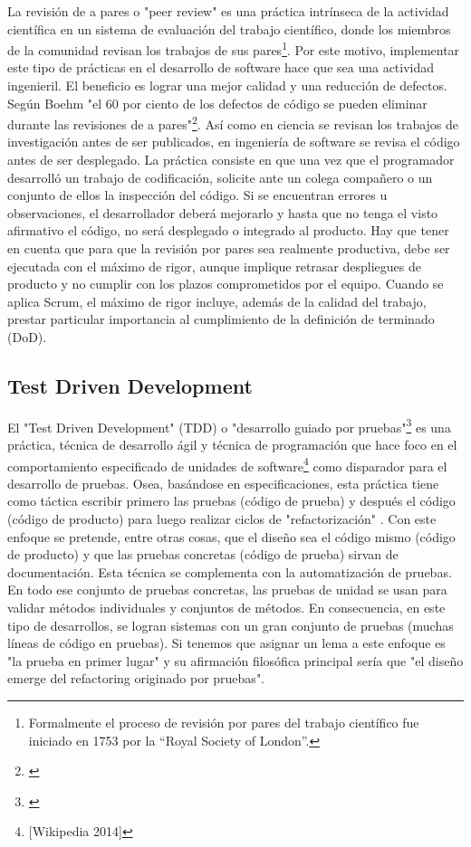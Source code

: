 La revisión de a pares o "peer review" es una práctica intrínseca de la actividad científica en un sistema de evaluación del trabajo científico, donde los miembros de la comunidad revisan los trabajos de sus pares\footnote{Formalmente el proceso de revisión por pares del trabajo científico fue iniciado en 1753 por la “Royal Society of London”.}. Por este motivo, implementar este tipo de prácticas en el desarrollo de software hace que sea una actividad ingenieril. El beneficio es lograr una mejor calidad y una reducción de defectos. Según Boehm "el 60 por ciento de los defectos de código se pueden eliminar durante las revisiones de a pares"\footnote{\cite{Boehm-2001}}. Así como en ciencia se revisan los trabajos de investigación antes de ser publicados, en ingeniería de software se revisa el código antes de ser desplegado.\newline
La práctica consiste en que una vez que el programador desarrolló un trabajo de codificación, solicite ante un colega compañero o un conjunto de ellos la inspección del código. Si se encuentran errores u observaciones, el desarrollador deberá mejorarlo y hasta que no tenga el visto afirmativo el código, no será desplegado o integrado al producto. Hay que tener en cuenta que para que la revisión por pares sea realmente productiva, debe ser ejecutada con el máximo de rigor, aunque implique retrasar despliegues de producto y no cumplir con los plazos comprometidos por el equipo. Cuando se aplica Scrum, el máximo de rigor incluye, además de la calidad del trabajo, prestar particular importancia al cumplimiento de la definición de terminado (DoD).

\subsection{Test Driven Development}

El "Test Driven Development" (TDD) o "desarrollo guiado por pruebas"\footnote{\cite{Jurado-2010}} es una práctica, técnica de desarrollo ágil y técnica de programación que hace foco en el comportamiento especificado de unidades de software\footnote{[Wikipedia 2014]} como disparador para el desarrollo de pruebas. Osea, basándose en especificaciones, esta práctica tiene como táctica escribir primero las pruebas (código de prueba) y después el código (código de producto) para luego realizar ciclos de "refactorización" \cite{Kent-Beck-2003}. Con este enfoque se pretende, entre otras cosas, que el diseño sea el código mismo (código de producto) y que las pruebas concretas (código de prueba) sirvan de documentación. Esta técnica se complementa con la automatización de pruebas. En todo ese conjunto de pruebas concretas, las pruebas de unidad se usan para validar métodos individuales y conjuntos de métodos. En consecuencia, en este tipo de desarrollos, se logran sistemas con un gran conjunto de pruebas (muchas líneas de código en pruebas).\newline
Si tenemos que asignar un lema a este enfoque es "la prueba en primer lugar" y su afirmación filosófica principal sería que "el diseño emerge del refactoring originado por pruebas".

